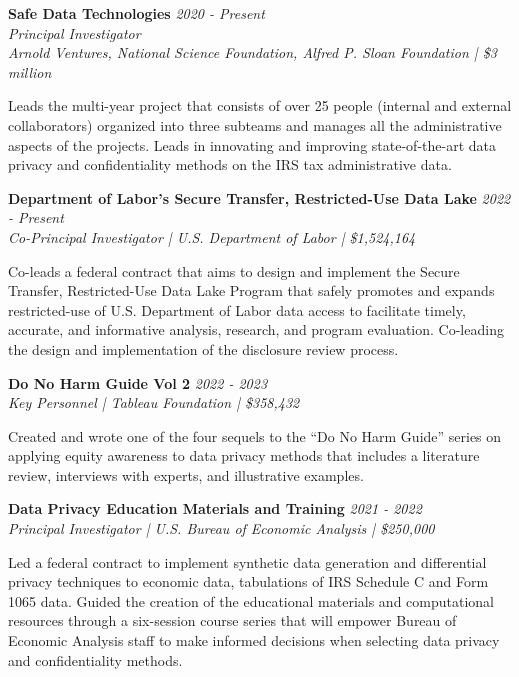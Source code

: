\textbf{Safe Data Technologies} \hfill \textit{2020 - Present}\\
\textit{Principal Investigator}\\ 
\textit{Arnold Ventures, National Science Foundation, Alfred P. Sloan Foundation | \$3 million}

Leads the multi-year project that consists of over 25 people (internal and external collaborators) organized into three subteams and manages all the administrative aspects of the projects. Leads in innovating and improving state-of-the-art data privacy and confidentiality methods on the IRS tax administrative data.

\projectspace
\textbf{Department of Labor's Secure Transfer, Restricted-Use Data Lake } \hfill \textit{2022 - Present}\\
\textit{Co-Principal Investigator | U.S. Department of Labor | \$1,524,164}

Co-leads a federal contract that aims to design and implement the Secure Transfer, Restricted-Use Data Lake Program that safely promotes and expands restricted-use of U.S. Department of Labor data access to facilitate timely, accurate, and informative analysis, research, and program evaluation. Co-leading the design and implementation of the disclosure review process. 

\projectspace
\textbf{Do No Harm Guide Vol 2} \hfill \textit{2022 - 2023}\\
\textit{Key Personnel | Tableau Foundation | \$358,432}

Created and wrote one of the four sequels to the ``Do No Harm Guide'' series on applying equity awareness to data privacy methods that includes a literature review, interviews with experts, and illustrative examples.

\projectspace
\textbf{Data Privacy Education Materials and Training } \hfill \textit{2021 - 2022}\\
\textit{Principal Investigator | U.S. Bureau of Economic Analysis | \$250,000}

Led a federal contract to implement synthetic data generation and differential privacy techniques to economic data, tabulations of IRS Schedule C and Form 1065 data. Guided the creation of the educational materials and computational resources through a six-session course series that will empower Bureau of Economic Analysis staff to make informed decisions when selecting data privacy and confidentiality methods.

